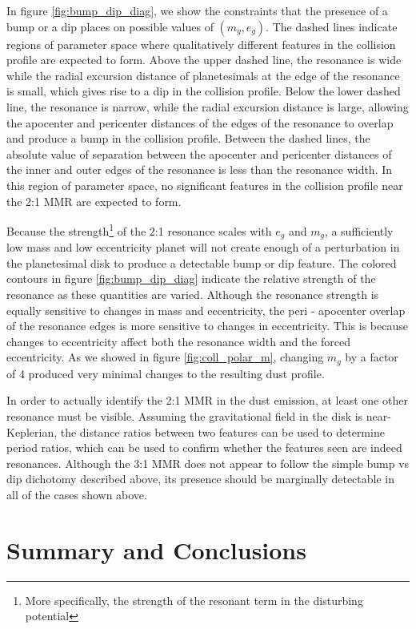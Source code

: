 \documentclass[twocolumn]{aastex63}
\begin{document}
In figure \ref{fig:bump_dip_diag}, we show the constraints that the presence of a bump or a dip places on possible values of $(m_{g}, e_{g})$. The dashed
lines indicate regions of parameter space where qualitatively different features in the collision profile are expected to form. Above the upper dashed line, the 
resonance is wide while the radial excursion distance of planetesimals at the edge of the resonance is small, which gives rise to a dip in the collision profile. 
Below the lower dashed line, the resonance is narrow, while the radial excursion distance is large, allowing the apocenter and pericenter distances of the edges 
of the resonance to overlap and produce a bump in the collision profile. Between the dashed lines, the absolute value of separation between the apocenter and 
pericenter distances of the inner and outer edges of the resonance is less than the resonance width. In this region of parameter space, no significant features in 
the collision profile near the 2:1 MMR are expected to form. 

Because the strength\footnote{More specifically, the strength of the resonant term in the disturbing potential} of the 2:1 resonance scales with $e_{g}$ and  $m_{g}$, a sufficiently low mass and low eccentricity planet will not create 
enough of a perturbation in the planetesimal disk to produce a detectable bump or dip feature. The colored contours in figure \ref{fig:bump_dip_diag} 
indicate the relative strength of the resonance as these quantities are varied. Although the resonance strength is equally sensitive to changes in 
mass and eccentricity, the peri - apocenter overlap of the resonance edges is more sensitive to changes in eccentricity. This is because changes to 
eccentricity affect both the resonance width and the forced eccentricity. As we showed in figure \ref{fig:coll_polar_m}, changing $m_{g}$ by a factor 
of 4 produced very minimal changes to the resulting dust profile.

In order to actually identify the 2:1 MMR in the dust emission, at least one other resonance must be visible. Assuming the gravitational field in the 
disk is near-Keplerian, the distance ratios between two features can be used to determine period ratios, which can be used to confirm whether the 
features seen are indeed resonances. Although the 3:1 MMR does not appear to follow the simple bump vs dip dichotomy described above, its 
presence should be marginally detectable in all of the cases shown above.

\section{Summary and Conclusions}\label{sec:conclusions}
\end{document}
